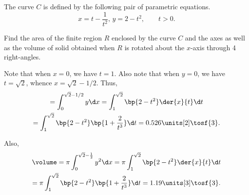\begin{problem}
    The curve $C$ is defined by the following pair of parametric equations. \[x = t - \frac1{t^2}, \, y = 2 - t^2,\qquad t > 0.\]

    Find the area of the finite region $R$ enclosed by the curve $C$ and the axes as well as the volume of solid obtained when $R$ is rotated about the $x$-axis through 4 right-angles.
\end{problem}
\begin{solution}
    \begin{center}
    \end{center}

    Note that when $x = 0$, we have $ t = 1$. Also note that when $y = 0$, we have $t = \sqrt2$, whence $x = \sqrt2 - 1/2$. Thus,
    \begin{gather*}
        [R] = \int_0^{\sqrt2 - 1/2} y \d x = \int_1^{\sqrt2} \bp{2 - t^2} \der{x}{t} \d t \\
        = \int_1^{\sqrt2} \bp{2 - t^2}\bp{1 + \frac2{t^3}} \d t = 0.526 \units[2] \tosf{3}.
    \end{gather*}

    Also,
    \begin{gather*}
        \volume = \pi \int_0^{\sqrt2 - \frac12} y^2 \d x = \pi\int_1^{\sqrt2} \bp{2 - t^2}\der{x}{t} \d t \\
        = \pi\int_1^{\sqrt2} \bp{2 - t^2}\bp{1 + \frac2{t^3}} \d t = 1.19 \units[3] \tosf{3}.
    \end{gather*}
\end{solution}

